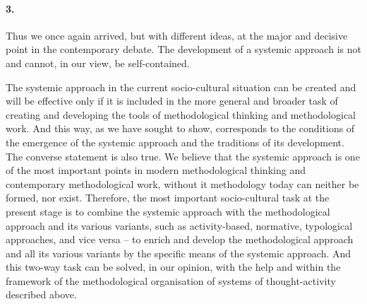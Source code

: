 \documentclass[11pt,a4paper]{article}
\begin{document}
\paragraph{3.}
Thus we once again arrived, but with different ideas, at the major and
decisive point in the contemporary debate. The development of a systemic
approach is not and cannot, in our view, be self-contained.

The systemic approach in the current socio-cultural situation can be created
and will be effective only if it is included in the more general and broader
task of creating and developing the tools of methodological thinking and
methodological work. And this way, as we have sought to show, corresponds to
the conditions of the emergence of the systemic approach and the traditions of
its development. The converse statement is also true. We believe that the
systemic approach is one of the most important points in modern methodological
thinking and contemporary methodological work, without it methodology today
can neither be formed, nor exist. Therefore, the most important socio-cultural
task at the present stage is to combine the systemic approach with the
methodological approach and its various variants, such as activity-based,
normative, typological approaches, and vice versa – to enrich and develop the
methodological approach and all its various variants by the specific means of
the systemic approach. And this two-way task can be solved, in our opinion,
with the help and within the framework of the methodological organisation of
systems of thought-activity described above. 
\end{document}
